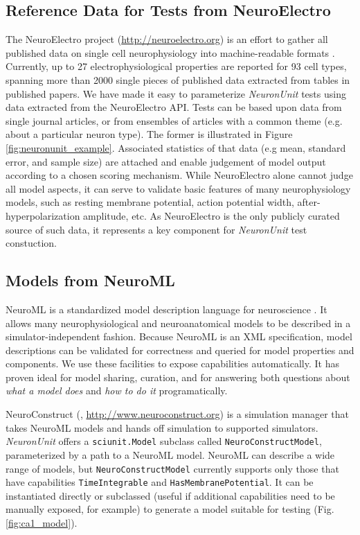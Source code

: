 \documentclass{frontiersSCNS}
\let\verbx\lstinline
\begin{document}
\subsection{Reference Data for Tests from NeuroElectro}\label{sec:neuroelectro} 
The NeuroElectro project (\url{http://neuroelectro.org}) is an effort to gather all published data on single cell neurophysiology into machine-readable formats \citep{tripathy_neuroelectro:_2012}.  
Currently, up to 27 electrophysiological properties are reported for 93 cell types, spanning more than 2000 single pieces of published data extracted from tables in published papers. 
We have made it easy to parameterize \textit{NeuronUnit} tests using data extracted from the NeuroElectro API. 
Tests can be based upon data from single journal articles, or from ensembles of articles with a common theme (e.g. about a particular neuron type). 
The former is illustrated in Figure \ref{fig:neuronunit_example}. 
Associated statistics of that data (e.g mean, standard error, and sample size) are attached and enable judgement of model output according to a chosen scoring mechanism. 
While NeuroElectro alone cannot judge all model aspects, it can serve to validate basic features of many neurophysiology models, such as resting membrane potential, action potential width, after-hyperpolarization amplitude, etc. 
As NeuroElectro is the only publicly curated source of such data, it represents a key component for \textit{NeuronUnit} test constuction.  

\subsection{Models from NeuroML}\label{sec:neuroml_models}
NeuroML is a standardized model description language for neuroscience \citep{gleeson_neuroml:_2010}. 
It allows many neurophysiological and neuroanatomical models to be described in a simulator-independent fashion. 
Because NeuroML is an XML specification, model descriptions can be validated for correctness and queried for model properties and components. We use these facilities to expose capabilities automatically. 
It has proven ideal for model sharing, curation, and for answering both questions about \textit{what a model does} and \textit{how to do it} programatically.  

NeuroConstruct (\cite{gleeson_neuroconstruct:_2007}, \url{http://www.neuroconstruct.org}) is a simulation manager that takes NeuroML models and hands off simulation to supported simulators. 
\textit{NeuronUnit} offers a \verbx{sciunit.Model} subclass called \verbx{NeuroConstructModel}, parameterized by a path to a NeuroML model.  
NeuroML can describe a wide range of models, but \verbx{NeuroConstructModel} currently supports only those that have capabilities \verbx{TimeIntegrable} and \verbx{HasMembranePotential}. It can be instantiated directly or subclassed (useful if additional capabilities need to be manually exposed, for example) to generate a model suitable for testing (Fig. \ref{fig:ca1_model}). 
\end{document}
